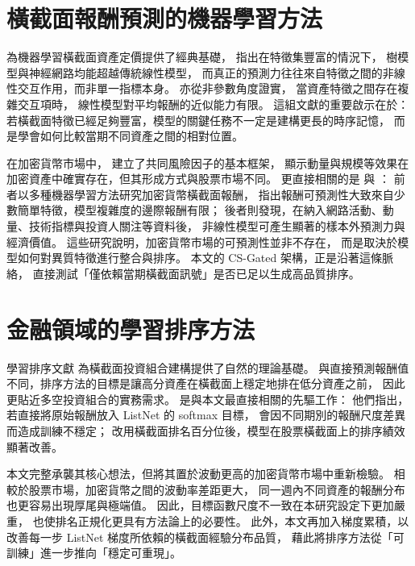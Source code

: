
\section{橫截面報酬預測的機器學習方法}

\citet{gu2020empirical} 為機器學習橫截面資產定價提供了經典基礎，
指出在特徵集豐富的情況下，
樹模型與神經網路均能超越傳統線性模型，
而真正的預測力往往來自特徵之間的非線性交互作用，而非單一指標本身。
\citet{freyberger2020dissecting} 亦從非參數角度證實，
當資產特徵之間存在複雜交互項時，
線性模型對平均報酬的近似能力有限。
這組文獻的重要啟示在於：
若橫截面特徵已經足夠豐富，模型的關鍵任務不一定是建構更長的時序記憶，
而是學會如何比較當期不同資產之間的相對位置。

在加密貨幣市場中，\citet{liu2022cryptocurrency} 建立了共同風險因子的基本框架，
顯示動量與規模等效果在加密資產中確實存在，但其形成方式與股票市場不同。
更直接相關的是 \citet{cakici2024crypto_ml} 與 \citet{filippou2024crypto_ml}：
前者以多種機器學習方法研究加密貨幣橫截面報酬，
指出報酬可預測性大致來自少數簡單特徵，模型複雜度的邊際報酬有限；
後者則發現，在納入網路活動、動量、技術指標與投資人關注等資料後，
非線性模型可產生顯著的樣本外預測力與經濟價值。
這些研究說明，加密貨幣市場的可預測性並非不存在，
而是取決於模型如何對異質特徵進行整合與排序。
本文的 CS-Gated 架構，正是沿著這條脈絡，
直接測試「僅依賴當期橫截面訊號」是否已足以生成高品質排序。

\section{金融領域的學習排序方法}

學習排序文獻 \citep{cao2007learning} 為橫截面投資組合建構提供了自然的理論基礎。
與直接預測報酬值不同，排序方法的目標是讓高分資產在橫截面上穩定地排在低分資產之前，
因此更貼近多空投資組合的實務需求。
\citet{poh2021building} 是與本文最直接相關的先驅工作：
他們指出，若直接將原始報酬放入 ListNet 的 softmax 目標，
會因不同期別的報酬尺度差異而造成訓練不穩定；
改用橫截面排名百分位後，模型在股票橫截面上的排序績效顯著改善。

本文完整承襲其核心想法，但將其置於波動更高的加密貨幣市場中重新檢驗。
相較於股票市場，加密貨幣之間的波動率差距更大，
同一週內不同資產的報酬分布也更容易出現厚尾與極端值。
因此，目標函數尺度不一致在本研究設定下更加嚴重，
也使排名正規化更具有方法論上的必要性。
此外，本文再加入梯度累積，以改善每一步 ListNet 梯度所依賴的橫截面經驗分布品質，
藉此將排序方法從「可訓練」進一步推向「穩定可重現」。

